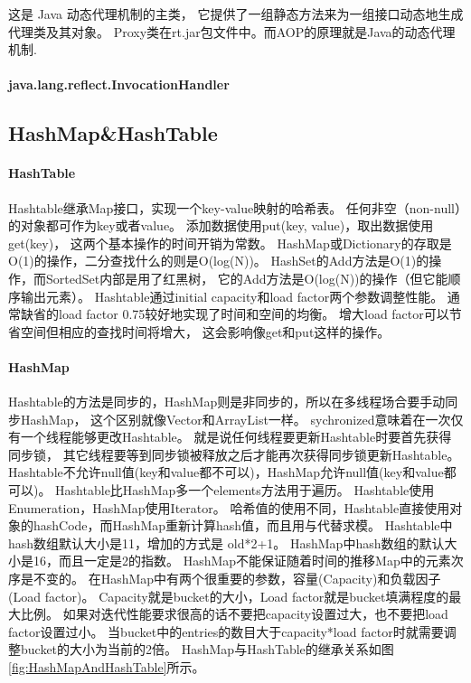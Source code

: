 \documentclass{book}
\begin{document}
这是 Java 动态代理机制的主类，
它提供了一组静态方法来为一组接口动态地生成代理类及其对象。
Proxy类在rt.jar包文件中。而AOP的原理就是Java的动态代理机制.

\paragraph{java.lang.reflect.InvocationHandler}

\subsection{HashMap\&HashTable}

\paragraph{HashTable}

Hashtable继承Map接口，实现一个key-value映射的哈希表。
任何非空（non-null）的对象都可作为key或者value。
添加数据使用put(key, value)，取出数据使用get(key)，
这两个基本操作的时间开销为常数。
HashMap或Dictionary的存取是O(1)的操作，二分查找什么的则是O(log(N))。
HashSet的Add方法是O(1)的操作，而SortedSet内部是用了红黑树，
它的Add方法是O(log(N))的操作（但它能顺序输出元素）。
Hashtable通过initial capacity和load factor两个参数调整性能。
通常缺省的load factor 0.75较好地实现了时间和空间的均衡。
增大load factor可以节省空间但相应的查找时间将增大，
这会影响像get和put这样的操作。

\paragraph{HashMap}

Hashtable的方法是同步的，HashMap则是非同步的，所以在多线程场合要手动同步HashMap，
这个区别就像Vector和ArrayList一样。
sychronized意味着在一次仅有一个线程能够更改Hashtable。
就是说任何线程要更新Hashtable时要首先获得同步锁，
其它线程要等到同步锁被释放之后才能再次获得同步锁更新Hashtable。
Hashtable不允许null值(key和value都不可以)，HashMap允许null值(key和value都可以)。
Hashtable比HashMap多一个elements方法用于遍历。
Hashtable使用Enumeration，HashMap使用Iterator。
哈希值的使用不同，Hashtable直接使用对象的hashCode，而HashMap重新计算hash值，而且用与代替求模。
Hashtable中hash数组默认大小是11，增加的方式是 old*2+1。
HashMap中hash数组的默认大小是16，而且一定是2的指数。
HashMap不能保证随着时间的推移Map中的元素次序是不变的。
在HashMap中有两个很重要的参数，容量(Capacity)和负载因子(Load factor)。
Capacity就是bucket的大小，Load factor就是bucket填满程度的最大比例。
如果对迭代性能要求很高的话不要把capacity设置过大，也不要把load factor设置过小。
当bucket中的entries的数目大于capacity*load factor时就需要调整bucket的大小为当前的2倍。
HashMap与HashTable的继承关系如图\ref{fig:HashMapAndHashTable}所示。
\end{document}
